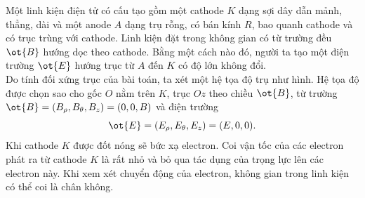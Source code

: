 \begin{vd} %
Một linh kiện điện tử có cấu tạo gồm một cathode $K$ dạng sợi dây dẫn mảnh, thẳng, dài và một anode $A$ dạng trụ rỗng, có bán kính ${R}$, bao quanh cathode và có trục trùng với cathode. Linh kiện đặt trong không gian có từ trường đều $\ot{B}$ hướng dọc theo cathode. Bằng một cách nào đó, người ta tạo một điện trường $\ot{E}$ hướng trục từ ${A}$ đến ${K}$ có độ lớn không đổi.\\
Do tính đối xứng trục của bài toán, ta xét một hệ tọa độ trụ như hình. Hệ tọa độ được chọn sao cho gốc ${O}$ nằm trên ${K}$, trục ${Oz}$ theo chiều $\ot{B}$, từ trường $\ot{B}=\left(B_{\rho}, B_{\theta}, B_{z}\right)=(0,0, B)$
và điện trường
$$\ot{E}=\left(E_{\rho}, E_{\theta}, E_{z}\right)=(E, 0,0).$$ 
Khi cathode ${K}$ được đốt nóng sẽ bức xạ electron. Coi vận tốc của các electron phát ra từ cathode ${K}$ là rất nhỏ và bỏ qua tác dụng của trọng lực lên các electron này. Khi xem xét chuyển động của electron, không gian trong linh kiện có thể coi là chân không.
\begin{center}
{

\begin{tikzpicture}[x=0.75pt,y=0.75pt,yscale=-1,xscale=1]


\end{tikzpicture}}
\end{center}
\end{vd}
